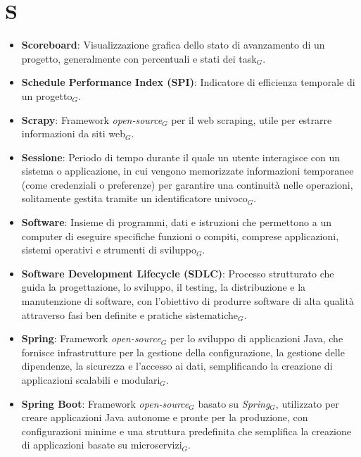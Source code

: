 \section{S}
\begin{itemize}
    \item \textbf{Scoreboard}: Visualizzazione grafica dello stato di avanzamento di un progetto, generalmente con percentuali e stati dei task$_G$.
    \item \textbf{Schedule Performance Index (SPI)}: Indicatore di efficienza temporale di un progetto$_G$.
    \item \textbf{Scrapy}: Framework \textit{open-source}$_G$ per il web scraping, utile per estrarre informazioni da siti web$_G$.
    \item \textbf{Sessione}: Periodo di tempo durante il quale un utente interagisce con un sistema o applicazione, in cui vengono memorizzate informazioni temporanee (come credenziali o preferenze) per garantire una continuità nelle operazioni, solitamente gestita tramite un identificatore univoco$_G$.
    \item \textbf{Software}: Insieme di programmi, dati e istruzioni che permettono a un computer di eseguire specifiche funzioni o compiti, comprese applicazioni, sistemi operativi e strumenti di sviluppo$_G$.
    \item \textbf{Software Development Lifecycle (SDLC)}: Processo strutturato che guida la progettazione, lo sviluppo, il testing, la distribuzione e la manutenzione di software, con l'obiettivo di produrre software di alta qualità attraverso fasi ben definite e pratiche sistematiche$_G$.
    \item \textbf{Spring}: Framework \textit{open-source}$_G$ per lo sviluppo di applicazioni Java, che fornisce infrastrutture per la gestione della configurazione, la gestione delle dipendenze, la sicurezza e l'accesso ai dati, semplificando la creazione di applicazioni scalabili e modulari$_G$.
    \item \textbf{Spring Boot}: Framework \textit{open-source}$_G$ basato su \textit{Spring}$_G$, utilizzato per creare applicazioni Java autonome e pronte per la produzione, con configurazioni minime e una struttura predefinita che semplifica la creazione di applicazioni basate su microservizi$_G$.

\end{itemize}
